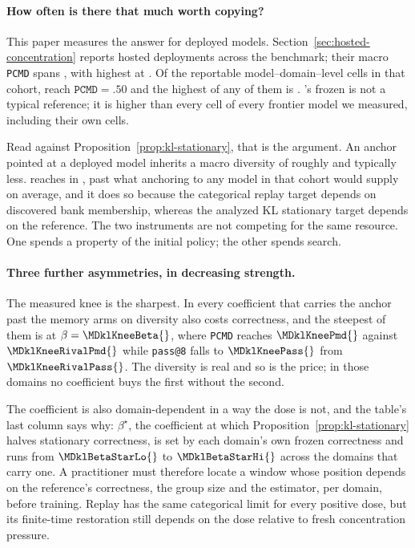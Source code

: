 \documentclass{article}
\newcommand{\1}{\mathbf 1}
\newcommand{\pmd}{\texttt{PCMD}}
\theoremstyle{remark}
\theoremstyle{definition}
\theoremstyle{plain}
\begin{document}
\paragraph{How often is there that much worth copying?}
This paper measures the answer for deployed models.
Section~\ref{sec:hosted-concentration} reports \MDklHostedModels{} hosted
deployments across the benchmark; their macro \pmd{} spans
\MDklHostedRange{}, with \MDklHostedHiModel{} highest at \MDklHostedHi{}. Of
the \MDklHostedCells{} reportable model--domain--level cells in that cohort,
\MDklHostedCellsHalf{} reach $\pmd{}=.50$ and the highest of any of them is
\MDklHostedCellMax{}. \MDklTopFrozenDomain{}'s frozen \MDklTopFrozenPmd{} is
not a typical reference; it is higher than every cell of every frontier model
we measured, including their own \MDklTopFrozenDomain{} cells.

Read against Proposition~\ref{prop:kl-stationary}, that is the argument. An
anchor pointed at a deployed model inherits a macro diversity of roughly
\MDklHostedHi{} and typically less. \MDklTopMemoryArm{} reaches
\MDklTopMemoryPmd{} in \MDklTopMemoryDomain{}, past what anchoring to any
model in that cohort would supply on average, and it does so because
the categorical replay target depends on discovered bank membership,
whereas the analyzed KL stationary target depends on the reference. The two instruments are
not competing for the same resource. One spends a property of the initial
policy; the other spends search.

\paragraph{Three further asymmetries, in decreasing strength.}
The measured knee is the sharpest. In \MDklPricedNames{} every coefficient
that carries the anchor past the memory arms on diversity also costs correctness,
and the steepest of them is \MDklKneeDomain{} at $\beta=\MDklKneeBeta{}$, where
\pmd{} reaches $\MDklKneePmd{}$ against $\MDklKneeRivalPmd{}$ while
\texttt{pass@8} falls to $\MDklKneePass{}$ from $\MDklKneeRivalPass{}$. The
diversity is real and so is the price; in those domains no coefficient buys the
first without the second.

The coefficient is also domain-dependent in a way the dose is not, and the
table's last column says why: $\beta^\star$, the coefficient at which
Proposition~\ref{prop:kl-stationary} halves stationary correctness, is set by
each domain's own frozen correctness and runs from $\MDklBetaStarLo{}$ to
$\MDklBetaStarHi{}$ across the domains that carry one. A practitioner must therefore locate a window whose position
depends on the reference's correctness, the group size and the estimator, per
domain, before training. Replay has the same categorical limit for every positive dose, but its
finite-time restoration still depends on the dose relative to fresh
concentration pressure.
\end{document}
